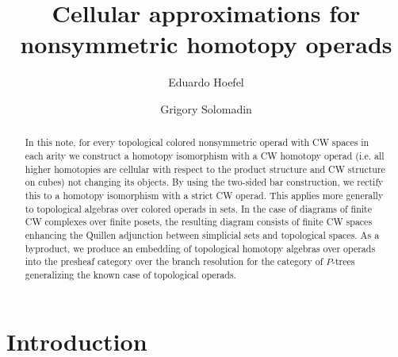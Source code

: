 \documentclass{amsart}
\theoremstyle{definition}
\theoremstyle{remark}
\begin{document}
	
	\author{Eduardo Hoefel}%
	\address[E.\,Hoefel]{Universidade Federal do Paran\'a, Brazil}
	
	\author{Grigory Solomadin}
	\address[G.\,Solomadin]{Philipps-Universit\"at Marburg, Germany}
	\title{Cellular approximations for nonsymmetric homotopy operads}


	\begin{abstract}
		In this note, for every topological colored nonsymmetric operad with CW spaces in each arity we construct a homotopy isomorphism with a CW homotopy operad (i.e. all higher homotopies are cellular with respect to the product structure and CW structure on cubes) not changing its objects.
		By using the two-sided bar construction, we rectify this to a homotopy isomorphism with a strict CW operad.
		This applies more generally to topological algebras over colored operads in sets.
		In the case of diagrams of finite CW complexes over finite posets, the resulting diagram consists of finite CW spaces enhancing the Quillen adjunction between simplicial sets and topological spaces.
		As a byproduct, we produce an embedding of topological homotopy algebras over operads into the presheaf category over the branch resolution for the category of $P$-trees generalizing the known case of topological operads.
	\end{abstract}
	
	
	\maketitle
	
	\section{Introduction}\label{sec:intro}
	
\end{document}
